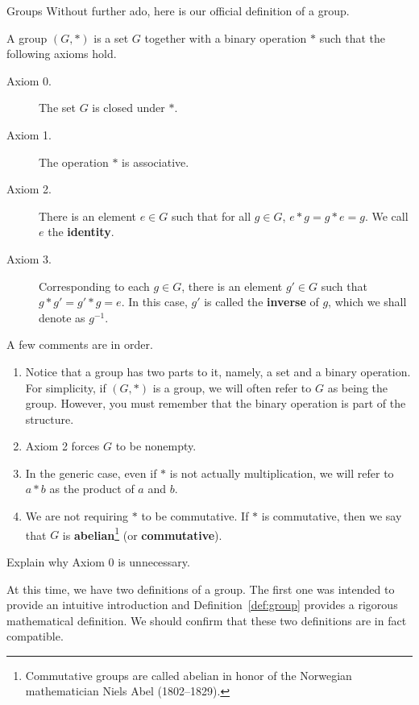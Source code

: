 \begin{section}{Groups}
Without further ado, here is our official definition of a group.

\begin{definition}\label{def:group}
A group \((G,*)\) is a set \(G\) together with a binary operation \(*\) such that the following axioms hold.
\begin{description}
\item[Axiom 0.] The set \(G\) is closed under \(*\).
\item[Axiom 1.] The operation \(*\) is associative.
\item[Axiom 2.] There is an element \(e\in G\) such that for all \(g\in G\), \(e*g=g*e=g\).  We call \(e\) the \textbf{identity}.
\item[Axiom 3.] Corresponding to each \(g\in G\), there is an element \(g'\in G\) such that \(g*g'=g'*g=e\).  In this case, \(g'\) is called the \textbf{inverse} of \(g\), which we shall denote as \(g^{-1}\).
\end{description}
\end{definition}

\begin{remark}
A few comments are in order.
\begin{enumerate}
\item Notice that a group has two parts to it, namely, a set and a binary operation.  For simplicity, if \((G,*)\) is a group, we will often refer to \(G\) as being the group.  However, you must remember that the binary operation is part of the structure.
\item Axiom 2 forces \(G\) to be nonempty.
\item In the generic case, even if \(*\) is not actually multiplication, we will refer to \(a*b\) as the product of \(a\) and \(b\).
\item We are not requiring \(*\) to be commutative.  If \(*\) is commutative, then we say that \(G\) is \textbf{abelian}\footnote{Commutative groups are called abelian in honor of the Norwegian mathematician Niels Abel (1802--1829).} (or \textbf{commutative}).
\end{enumerate}
\end{remark}

\begin{exercise}
Explain why Axiom 0 is unnecessary.
\end{exercise}

At this time, we have two definitions of a group.  The first one was intended to provide an intuitive introduction and Definition~\ref{def:group} provides a rigorous mathematical definition.  We should confirm that these two definitions are in fact compatible.


\end{section}
